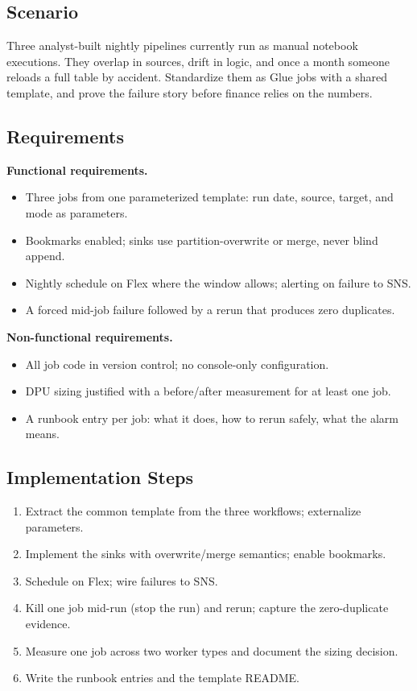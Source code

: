 \subsection*{Scenario}
Three analyst-built nightly pipelines currently run as manual notebook executions. They overlap in sources, drift in logic, and once a month someone reloads a full table by accident. Standardize them as Glue jobs with a shared template, and prove the failure story before finance relies on the numbers.

\subsection*{Requirements}
\textbf{Functional requirements.}
\begin{itemize}
    \item Three jobs from one parameterized template: run date, source, target, and mode as parameters.
    \item Bookmarks enabled; sinks use partition-overwrite or merge, never blind append.
    \item Nightly schedule on Flex where the window allows; alerting on failure to SNS.
    \item A forced mid-job failure followed by a rerun that produces zero duplicates.
\end{itemize}

\textbf{Non-functional requirements.}
\begin{itemize}
    \item All job code in version control; no console-only configuration.
    \item DPU sizing justified with a before/after measurement for at least one job.
    \item A runbook entry per job: what it does, how to rerun safely, what the alarm means.
\end{itemize}

\subsection*{Implementation Steps}
\begin{enumerate}
    \item Extract the common template from the three workflows; externalize parameters.
    \item Implement the sinks with overwrite/merge semantics; enable bookmarks.
    \item Schedule on Flex; wire failures to SNS.
    \item Kill one job mid-run (stop the run) and rerun; capture the zero-duplicate evidence.
    \item Measure one job across two worker types and document the sizing decision.
    \item Write the runbook entries and the template README.
\end{enumerate}

